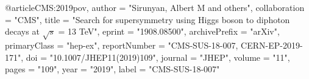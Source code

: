 @article{CMS:2019pov,
    author = "Sirunyan, Albert M and others",
    collaboration = "CMS",
    title = "{Search for supersymmetry using Higgs boson to diphoton decays at $\sqrt{s}$ = 13 TeV}",
    eprint = "1908.08500",
    archivePrefix = "arXiv",
    primaryClass = "hep-ex",
    reportNumber = "CMS-SUS-18-007, CERN-EP-2019-171",
    doi = "10.1007/JHEP11(2019)109",
    journal = "JHEP",
    volume = "11",
    pages = "109",
    year = "2019",
    label = "CMS-SUS-18-007"
}

